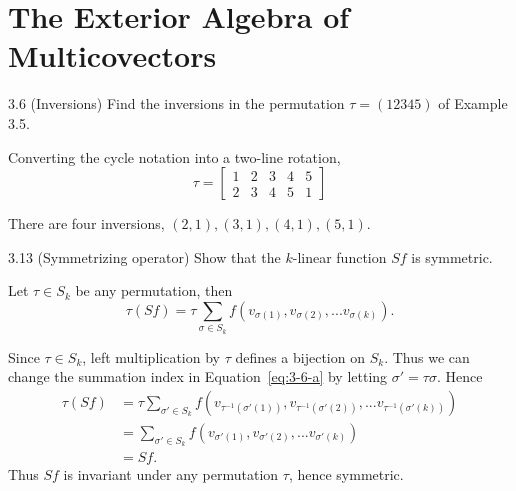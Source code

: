 \section{The Exterior Algebra of Multicovectors}

\begin{exercise}{3.6 (Inversions)}
    Find the inversions in the permutation $\tau =(1 2 3 4 5)$ of Example 3.5.
\end{exercise}

Converting the cycle notation into a two-line rotation,
\begin{equation}
    \tau = \begin{bmatrix}
        1 & 2 & 3 & 4 & 5 \\ 
        2 & 3 & 4 & 5 & 1 
    \end{bmatrix}
\end{equation}

There are four inversions, $(2, 1), (3, 1), (4, 1), (5, 1)$.

\begin{exercise}{3.13 (Symmetrizing operator)}
    Show that the $k$-linear function $Sf$ is symmetric.
\end{exercise}

Let $\tau \in S_k$ be any permutation, then
\begin{equation} \label{eq:3-6-a}
    \tau (Sf) = \tau \sum_{\sigma \in S_k} f(v_{\sigma(1)}, v_{\sigma(2)}, ... v_{\sigma(k)}).
\end{equation}

Since $\tau \in S_k$, left multiplication by $\tau$ defines a bijection on $S_k$. Thus 
we can change the summation index in Equation~\ref{eq:3-6-a} by letting $\sigma' = \tau \sigma$. Hence 
\begin{align}
    \tau (Sf) &= \tau \sum_{\sigma' \in S_k} f(v_{\tau^{-1}(\sigma'(1))}, v_{\tau^{-1}(\sigma'(2))}, ... v_{\tau^{-1}(\sigma'(k))}) \\ 
    &= \sum_{\sigma' \in S_k} f(v_{\sigma'(1)}, v_{\sigma'(2)}, ... v_{\sigma'(k)}) \\ 
    &= Sf.
\end{align}
Thus $Sf$ is invariant under any permutation $\tau$, hence symmetric.